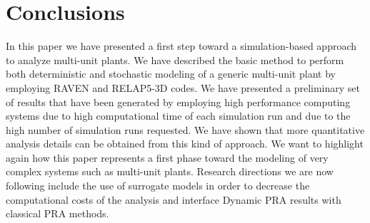 \section{Conclusions}
\label{sec:conclusions}

In this paper we have presented a first step toward a simulation-based approach to analyze 
multi-unit plants. We have described the basic method to perform both deterministic and 
stochastic modeling of a generic multi-unit plant by employing RAVEN and RELAP5-3D codes. 
We have presented a preliminary set of results that have been generated by employing high 
performance computing systems due to high computational time of each simulation run and due 
to the high number of simulation runs requested. We have shown that more quantitative analysis 
details can be obtained from this kind of approach.
We want to highlight again how this paper represents a first phase toward the modeling of 
very complex systems such as multi-unit plants. Research directions we are now following 
include the use of surrogate models in order to decrease the computational costs of the analysis 
and interface Dynamic PRA results with classical PRA methods.
